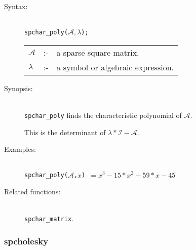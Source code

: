 \begin{description}
\item[Syntax:]\mbox{}\\
\texttt{spchar\_poly($\mathcal{A},\lambda$);}\\[2mm]
\begin{tabular}{l l l}
$\mathcal{A}$ &:-& a sparse square matrix. \\
$\lambda$ &:-& a symbol or algebraic expression.
\end{tabular}

\item[Synopsis:]\mbox{}\\
\texttt{spchar\_poly} finds the characteristic polynomial of
                $\mathcal{A}$.  

This is the determinant of $\lambda * \mathcal{I} - \mathcal{A}$.

\item[Examples:]\mbox{}\\
\texttt{spchar\_poly($\mathcal{A}$,$x$) $= x^3-15*x^2-59*x-45$} 

\item[Related functions:]\mbox{}\\
\texttt{spchar\_matrix}. 
\end{description}

\subsubsection{spcholesky}
\label{sparse:spcholesky}

